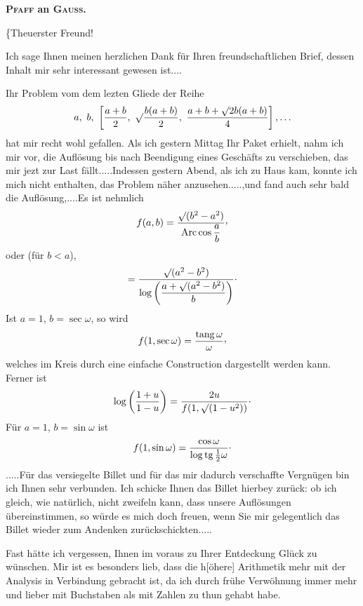 \begingroup
{}
\begin{center}\large\bfseries\textsc{Pfaff} an \textsc{Gauss}.\end{center}
\begin{center}\{Theuerster Freund!\end{center}
\par\indent Ich sage Ihnen meinen herzlichen Dank für Ihren freundschaftlichen Brief, dessen Inhalt mir sehr interessant gewesen ist\quad .\quad .\quad .\quad .

\par\indent Ihr Problem vom dem lezten Gliede der Reihe
\[
a,\ b,\ \left[\frac{a+b}{2},\ \surd\frac{b(a+b)}{2},\ \frac{a+b+\surd2b(a+b)}{4}\right],\ldots
\]
\noindent hat mir recht wohl gefallen. Als ich gestern Mittag Ihr Paket erhielt, nahm ich mir vor, die Auflösung bis nach Beendigung eines Geschäfts zu verschieben, das mir jezt zur Last fällt\quad .\quad .\quad .\quad .\quad .\quad Indessen gestern Abend, als ich zu Haus kam, konnte ich mich nicht enthalten, das Problem näher anzusehen\quad .\quad .\quad .\quad .\quad .,\quad und fand auch sehr bald die Auflösung,\quad .\quad .\quad .\quad .\quad Es ist nehmlich
\[
f(a,b)=\frac{\surd(b^2-a^2)}{\operatorname{Arc}\cos\dfrac ab}\mathpunct{\raisebox{.5ex}{,}}
\]
\noindent oder (für $b<a$),
\[
=\frac{\surd(a^2-b^2)}{\log\left(\dfrac{a+\surd(a^2-b^2)}b\right)}\mathpunct{\raisebox{.5ex}{.}}
\]
\noindent Ist $a=1$, $b=\sec\omega$, so wird
\[
f(1,\sec\omega)=\frac{\operatorname{tang}\omega}{\omega}\mathpunct{\raisebox{.5ex}{,}}
\]
\noindent welches im Kreis durch eine einfache Construction dargestellt werden kann. Ferner ist
\[
\log\left(\frac{1+u}{1-u}\right)=\frac{2u}{f(1,\surd(1-u^2))}\mathpunct{\raisebox{.5ex}{.}}
\]
\noindent Für $a=1$, $b=\sin\omega$ ist
\[
f(1,\sin\omega)=\frac{\cos\omega}{\log\operatorname{tg}\tfrac12\omega}\mathpunct{\raisebox{.5ex}{.}}
\]
\noindent .\quad .\quad .\quad .\quad .\quad Für das versiegelte Billet und für das mir dadurch verschaffte
\clearpage
{}
\noindent Vergnügen bin ich Ihnen sehr verbunden. Ich schicke Ihnen das Billet hierbey zurück: ob ich gleich, wie natürlich, nicht zweifeln kann, dass unsere Auflösungen übereinstimmen, so würde es mich doch freuen, wenn Sie mir gelegentlich das Billet wieder zum Andenken zurückschickten.\quad .\quad .\quad .\quad .

\par\indent Fast hätte ich vergessen, Ihnen im voraus zu Ihrer Entdeckung Glück zu wünschen. Mir ist es besonders lieb, dass die h[öhere] Arithmetik mehr mit der Analysis in Verbindung gebracht ist, da ich durch frühe Verwöhnung immer mehr und lieber mit Buchstaben als mit Zahlen zu thun gehabt habe.

